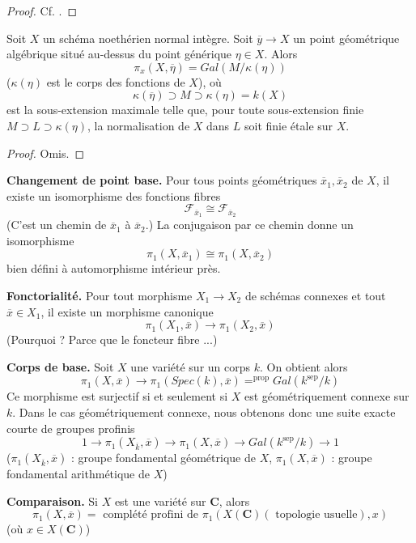\begin{proof}
Cf. \cite{SGA1}.
\end{proof}

\begin{proposition}
\label{proposition-integral-normal-fundamental-group}
Soit $X$ un schéma noethérien normal intègre. Soit
$\overline y\to X$ un point géométrique algébrique situé
au-dessus du point générique $\eta\in X$. Alors
$$
\pi_x(X, \overline \eta) = Gal(M/\kappa(\eta))
$$
($\kappa(\eta)$ est le corps des fonctions de $X$), où
$$
\kappa(\overline \eta)\supset M\supset \kappa(\eta) = k(X)
$$
est la sous-extension maximale telle que, pour toute sous-extension finie
$M\supset L\supset \kappa(\eta)$, la normalisation de $X$ dans $L$ soit finie
\'etale sur $X$.
\end{proposition}

\begin{proof}
Omis.
\end{proof}

\noindent
{\bf Changement de point base.} Pour tous points géométriques $\overline{x}_1, \overline{x}_2$
de $X$, il existe un isomorphisme des fonctions fibres
$$
\mathcal{F}_{\overline{x}_1} \cong \mathcal{F}_{\overline{x}_2}
$$
(C'est un chemin de $\overline{x}_1$ à $\overline{x}_2$.) La conjugaison
par ce chemin donne un isomorphisme
$$
\pi_1(X, \overline{x}_1) \cong \pi_1(X, \overline{x}_2)
$$
bien défini à automorphisme intérieur près.

\medskip\noindent
{\bf Fonctorialité.} Pour tout morphisme $X_1\to X_2$ de schémas connexes
et tout $\overline{x}\in X_1$, il existe un morphisme canonique
$$
\pi_1(X_1, \overline{x}) \to \pi_1(X_2, \overline{x})
$$
(Pourquoi ? Parce que le foncteur fibre ...)

\medskip\noindent
{\bf Corps de base.} Soit $X$ une variété sur un corps $k$. On obtient alors
$$
\pi_1(X, \overline{x}) \to
\pi_1(Spec(k), \overline{x}) =^{\text{prop}} Gal(k^{\text{sep}}/k)
$$
Ce morphisme est surjectif si et seulement si $X$ est géométriquement connexe sur $k$.
Dans le cas géométriquement connexe, nous obtenons donc une suite exacte courte de groupes
profinis
$$
1 \to \pi_1(X_{\overline{k}}, \overline{x}) \to
\pi_1(X, \overline{x}) \to
Gal(k^{\text{sep}}/k) \to 1
$$
($\pi_1(X_{\overline{k}}, \overline{x})$ : groupe fondamental géométrique de
$X$, $\pi_1(X, \overline{x})$ : groupe fondamental arithmétique de $X$)

\medskip\noindent
{\bf Comparaison.} Si $X$ est une variété sur $\mathbf{C}$, alors
$$
\pi_1(X, \overline{x}) =
\text{ complété profini de }
\pi_1(X(\mathbf{C})(\text{ topologie usuelle}), x)
$$
(où $x\in X(\mathbf{C})$)

